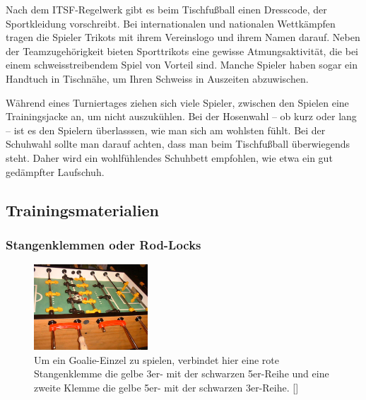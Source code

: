 Nach dem ITSF-Regelwerk gibt es beim Tischfußball einen Dresscode, der Sportkleidung vorschreibt. 
Bei internationalen und nationalen Wettkämpfen tragen die Spieler Trikots mit ihrem Vereinslogo und ihrem Namen darauf. 
Neben der Teamzugehörigkeit bieten Sporttrikots eine gewisse Atmungsaktivität, die bei einem schweisstreibendem Spiel von Vorteil sind. 
Manche Spieler haben sogar ein Handtuch in Tischnähe, um Ihren Schweiss in Auszeiten abzuwischen.

Während eines Turniertages ziehen sich viele Spieler, zwischen den Spielen eine Trainingsjacke an, um nicht auszukühlen.
Bei der Hosenwahl -- ob kurz oder lang -- ist es den Spielern überlasssen, wie man sich am wohlsten fühlt. 
Bei der Schuhwahl sollte man darauf achten, dass man beim Tischfußball überwiegends steht. 
Daher wird ein wohlfühlendes Schuhbett empfohlen, wie etwa ein gut gedämpfter Laufschuh.  

\subsection{Trainingsmaterialien}
\label{tisch:zubehoer:training}

\subsubsection{Stangenklemmen oder Rod-Locks}
\label{tisch:zubehoer:training:rodlock}

\begin{figure}
    \centering 
        \includegraphics[width=0.38\textwidth]{img/rodlock_goalie.jpg} 
        \caption{Um ein Goalie-Einzel zu spielen, verbindet hier eine rote Stangenklemme die gelbe 3er- mit der schwarzen 5er-Reihe und eine zweite Klemme die gelbe 5er- mit der schwarzen 3er-Reihe. [\cite{www:rod-lock}]} 
        \label{fig:rod-lock} 
\end{figure}

